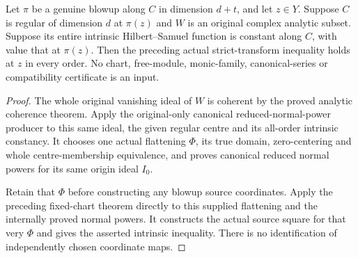 \begin{theorem}
\label{hir:actual-original-hs-constant-centre-geometric-bennett}
\leanok
Let $\pi$ be a genuine blowup along $C$ in dimension $d+t$,
and let $z\in Y$. Suppose $C$ is regular of dimension $d$ at
$\pi(z)$ and $W$ is an original complex analytic subset.
Suppose its entire intrinsic Hilbert--Samuel function is
constant along $C$, with value that at $\pi(z)$.
Then the preceding actual strict-transform inequality holds
at $z$ in every order. No chart, free-module, monic-family,
canonical-series or compatibility certificate is an input.
\end{theorem}
\begin{proof}
The whole original vanishing ideal of $W$ is coherent by the
proved analytic coherence theorem. Apply the original-only
canonical reduced-normal-power producer to this same ideal,
the given regular centre and its all-order intrinsic constancy.
It chooses one actual flattening $\Phi$, its true domain,
zero-centering and whole centre-membership equivalence, and
proves canonical reduced normal powers for its same origin
ideal $I_0$.

Retain that $\Phi$ before constructing any blowup source
coordinates. Apply the preceding fixed-chart theorem directly
to this supplied flattening and the internally proved normal
powers. It constructs the actual source square for that very
$\Phi$ and gives the asserted intrinsic inequality. There is
no identification of independently chosen coordinate maps.
\end{proof}


